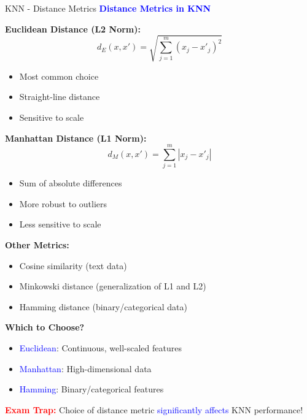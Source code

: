 \documentclass[8pt]{beamer}
\begin{document}
	\begin{frame}{KNN - Distance Metrics}
		\fontsize{6.5}{7.5}\selectfont
		\textcolor{blue}{\textbf{Distance Metrics in KNN}}
		
		\textbf{Euclidean Distance (L2 Norm):}
		\[
		d_E(x, x') = \sqrt{\sum_{j=1}^m (x_j - x'_j)^2}
		\]
		\begin{itemize}
			\item Most common choice
			\item Straight-line distance
			\item Sensitive to scale
		\end{itemize}
		
		\textbf{Manhattan Distance (L1 Norm):}
		\[
		d_M(x, x') = \sum_{j=1}^m |x_j - x'_j|
		\]
		\begin{itemize}
			\item Sum of absolute differences
			\item More robust to outliers
			\item Less sensitive to scale
		\end{itemize}
		
		\textbf{Other Metrics:}
		\begin{itemize}
			\item Cosine similarity (text data)
			\item Minkowski distance (generalization of L1 and L2)
			\item Hamming distance (binary/categorical data)
		\end{itemize}
		
		\textbf{Which to Choose?}
		\begin{itemize}
			\item \textcolor{blue}{Euclidean}: Continuous, well-scaled features
			\item \textcolor{blue}{Manhattan}: High-dimensional data
			\item \textcolor{blue}{Hamming}: Binary/categorical features
		\end{itemize}
		
		\textcolor{red}{\textbf{Exam Trap:}} Choice of distance metric \textcolor{blue}{significantly affects} KNN performance!
	\end{frame}
	
\end{document}
